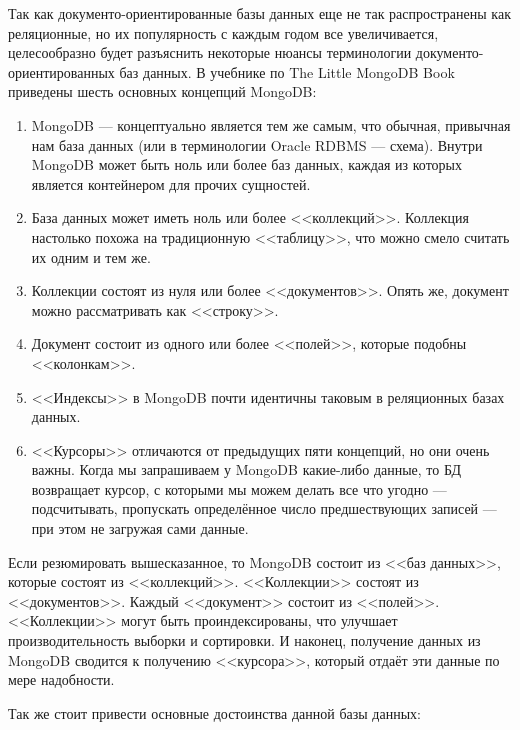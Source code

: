 \documentclass[14pt]{extreport}
\begin{document}
Так как документо-ориентированные базы данных еще не так распространены как реляционные, но их популярность с каждым годом все увеличивается, целесообразно будет разъяснить некоторые нюансы терминологии документо-ориентированных баз данных. В учебнике по The Little MongoDB Book\cite{bib:mongo} приведены шесть основных концепций MongoDB:

\begin{enumerate}

\item MongoDB — концептуально является тем же самым, что обычная, привычная нам база данных (или в терминологии Oracle RDBMS — схема). Внутри MongoDB может быть ноль или более баз данных, каждая из которых является контейнером для прочих сущностей.

\item База данных может иметь ноль или более <<коллекций>>. Коллекция настолько похожа на традиционную <<таблицу>>, что можно смело считать их одним и тем же.

\item Коллекции состоят из нуля или более <<документов>>. Опять же, документ можно рассматривать как <<строку>>.

\item Документ состоит из одного или более <<полей>>, которые подобны <<колонкам>>.

\item <<Индексы>> в MongoDB почти идентичны таковым в реляционных базах данных.

\item <<Курсоры>> отличаются от предыдущих пяти концепций, но они очень важны. Когда мы запрашиваем у MongoDB какие-либо данные, то БД возвращает курсор, с которыми мы можем делать все что угодно — подсчитывать, пропускать определённое число предшествующих записей — при этом не загружая сами данные.

\end{enumerate}

Если резюмировать вышесказанное, то MongoDB состоит из <<баз данных>>, которые состоят из <<коллекций>>. <<Коллекции>> состоят из <<документов>>. Каждый <<документ>> состоит из <<полей>>. <<Коллекции>> могут быть проиндексированы, что улучшает производительность выборки и сортировки. И наконец, получение данных из MongoDB сводится к получению <<курсора>>, который отдаёт эти данные по мере надобности.

Так же стоит привести основные достоинства данной базы данных:
\end{document}
